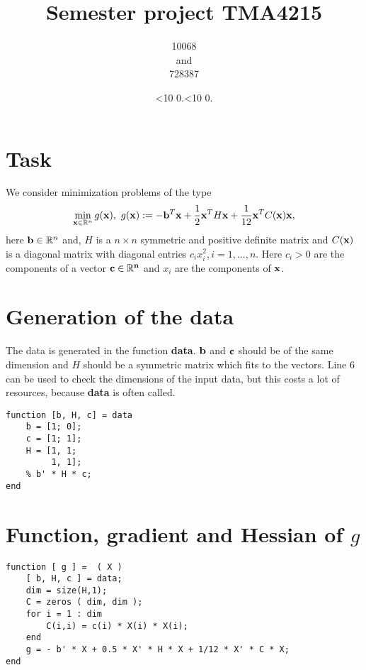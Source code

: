 \documentclass[a4paper,12pt]{article}
\newcommand{\leadingzero}[1]{\ifnum #1<10 0\the#1\else\the#1\fi}
\newcommand{\mytoday}{\leadingzero{\day}.\leadingzero{\month}.\the\year}
\newcommand{\code}[1]{\textbf{#1}}
\begin{document}
\title{Semester project TMA4215}
\author{10068\\ and\\ 728387}
\date{\mytoday}
\maketitle
\newpage


\section{Task}
We consider minimization problems of the type
\begin{align*}
\min_{{\bf x} \in \mathbb{R}^n} g({\bf x}),\,\, g({\bf x}):=-{\bf b}^T{\bf x} + \frac12{\bf x}^TH{\bf x}+\frac1{12}{\bf x}^TC({\bf x}){\bf x},
\end{align*}
here ${\bf b} \in \mathbb{R}^n$ and, $H$ is a $n \times n$ symmetric and positive definite matrix and $C(\bf{x})$ is a diagonal
matrix with diagonal entries $c_i x^2_i, i = 1, . . . , n$. 
Here $c_i > 0$ are the components of a vector $\bf{c} \in \mathbb{R}^n$ 
and $x_i$ are the components of $\bf{x}$. 
\section{Generation of the data}
The data is generated in the function \code{data}.
$\bf{b}$ and $\bf{c}$ should be of the same dimension and $H$ should be a symmetric matrix which fits to the vectors.
Line 6 can be used to check the dimensions of the input data, but this costs a lot of resources, because \code{data} is often called. 


\begin{lstlisting}
function [b, H, c] = data
	b = [1; 0];
	c = [1; 1];
	H = [1, 1;
	     1, 1];
	% b' * H * c;
end
\end{lstlisting}

\section{Function, gradient and Hessian of $g$}

\begin{lstlisting}
function [ g ] =  ( X )
	[ b, H, c ] = data;
	dim = size(H,1);
	C = zeros ( dim, dim );
	for i = 1 : dim
		C(i,i) = c(i) * X(i) * X(i);
	end
	g = - b' * X + 0.5 * X' * H * X + 1/12 * X' * C * X;
end
\end{lstlisting}
\end{document}

